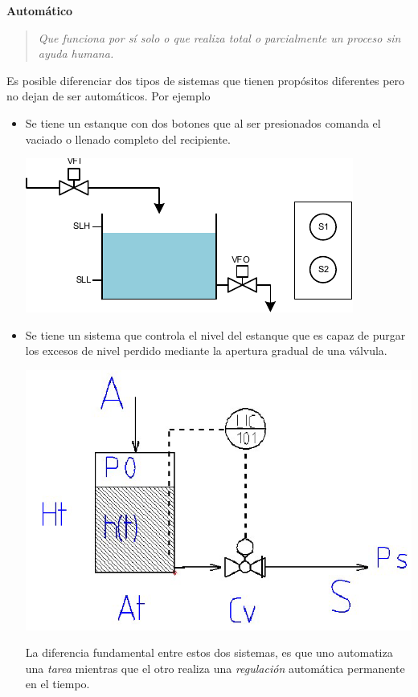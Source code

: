 \documentclass[letterpaper,journal]{ieeetran}
\begin{document}
\textbf{Automático}
\begin{quotation}
	\it
	Que funciona por sí solo o que realiza total o parcialmente un proceso sin ayuda humana.
\end{quotation}
\vspace{10pt}
Es posible diferenciar dos tipos de sistemas que tienen propósitos diferentes pero no dejan de ser automáticos. Por ejemplo 
\begin{itemize}
	\item Se tiene un estanque con dos botones que al ser presionados comanda el vaciado o llenado completo del recipiente.
	\begin{center}
		\includegraphics[scale=0.8]{Estanque.pdf}
	\end{center}
	
	\item Se tiene un sistema que controla el nivel del estanque que es capaz de purgar los excesos de nivel perdido mediante la apertura gradual de una válvula.
	\begin{center}
		\includegraphics[scale=0.23]{EstanqueControl.png}
	\end{center}
	
	La diferencia fundamental entre estos dos sistemas, es que uno automatiza una \emph{tarea} mientras que el otro realiza una \emph{regulación} automática permanente en el tiempo.
	

\end{itemize}
\end{document}
